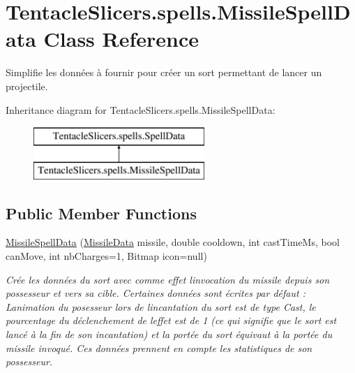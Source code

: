 \hypertarget{class_tentacle_slicers_1_1spells_1_1_missile_spell_data}{}\section{Tentacle\+Slicers.\+spells.\+Missile\+Spell\+Data Class Reference}
\label{class_tentacle_slicers_1_1spells_1_1_missile_spell_data}


Simplifie les données à fournir pour créer un sort permettant de lancer un projectile.  


Inheritance diagram for Tentacle\+Slicers.\+spells.\+Missile\+Spell\+Data\+:\begin{figure}[H]
\begin{center}
\leavevmode
\includegraphics[height=2.000000cm]{class_tentacle_slicers_1_1spells_1_1_missile_spell_data}
\end{center}
\end{figure}
\subsection*{Public Member Functions}
\begin{DoxyCompactItemize}
\item 
\hyperlink{class_tentacle_slicers_1_1spells_1_1_missile_spell_data_a2fa33e8019fce370d394311c81737a00}{Missile\+Spell\+Data} (\hyperlink{class_tentacle_slicers_1_1actors_1_1_missile_data}{Missile\+Data} missile, double cooldown, int cast\+Time\+Ms, bool can\+Move, int nb\+Charges=1, Bitmap icon=null)
\begin{DoxyCompactList}\small\item\em Crée les données du sort avec comme effet l\textquotesingle{}invocation du missile depuis son possesseur et vers sa cible. Certaines données sont écrites par défaut \+: L\textquotesingle{}animation du posesseur lors de l\textquotesingle{}incantation du sort est de type Cast, le pourcentage du déclenchement de l\textquotesingle{}effet est de 1 (ce qui signifie que le sort est lancé à la fin de son incantation) et la portée du sort équivaut à la portée du missile invoqué. Ces données prennent en compte les statistiques de son possesseur. \end{DoxyCompactList}\end{DoxyCompactItemize}

